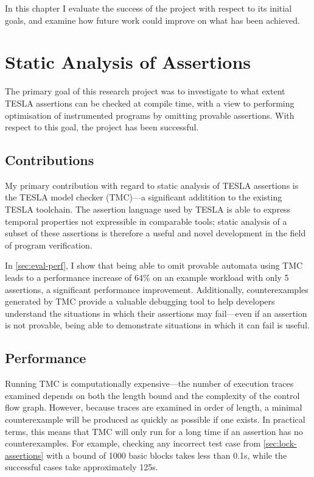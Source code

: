 In this chapter I evaluate the success of the project with respect to its
initial goals, and examine how future work could improve on what has been
achieved.

\section{Static Analysis of Assertions}

The primary goal of this research project was to investigate to what extent
TESLA assertions can be checked at compile time, with a view to performing
optimisation of instrumented programs by omitting provable assertions. With
respect to this goal, the project has been successful.

\subsection{Contributions}

My primary contribution with regard to static analysis of TESLA assertions is
the TESLA model checker (TMC)---a significant additition to the existing TESLA
toolchain. The assertion language used by TESLA is able to express temporal
properties not expressible in comparable tools; static analysis of a subset of
these assertions is therefore a useful and novel development in the field of
program verification.

In \autoref{sec:eval-perf}, I show that being able to omit provable
automata using TMC leads to a performance increase of 64\% on an example
workload with only 5 assertions, a significant performance improvement.
Additionally, counterexamples generated by TMC provide a valuable
debugging tool to help developers understand the situations in which
their assertions may fail---even if an assertion is not provable, being
able to demonstrate situations in which it can fail is useful.

\subsection{Performance}

Running TMC is computationally expensive---the number of execution traces
examined depends on both the length bound and the complexity of the control flow
graph. However, because traces are examined in order of length, a minimal
counterexample will be produced as quickly as possible if one exists. In
practical terms, this means that TMC will only run for a long time if an
assertion has no counterexamples. For example, checking any incorrect test case
from \autoref{sec:lock-assertions} with a bound of \num{1000} basic blocks takes
less than \num{0.1}\si{\second}, while the successful cases take approximately
\num{125}\si{\second}.

